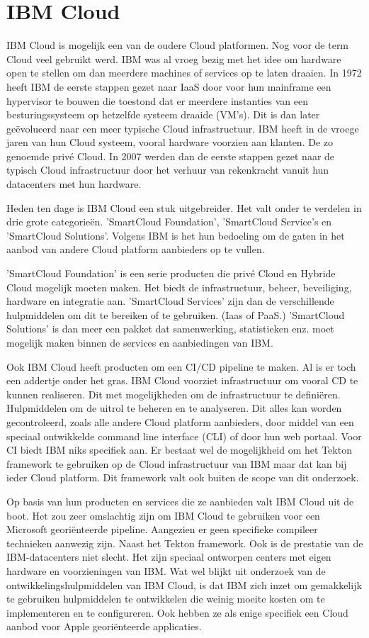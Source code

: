\section{IBM Cloud}
\label{sec:ibmcloud}
IBM Cloud is mogelijk een van de oudere Cloud platformen. Nog voor de term Cloud veel gebruikt werd. IBM was al vroeg bezig met het idee om hardware open te stellen om dan meerdere machines of services op te laten draaien. In 1972 heeft IBM de eerste stappen gezet naar IaaS door voor hun mainframe een hypervisor te bouwen die toestond dat er meerdere instanties van een besturingssysteem op hetzelfde systeem draaide (VM’s). Dit is dan later geëvolueerd naar een meer typische Cloud infrastructuur. IBM heeft in de vroege jaren van hun Cloud systeem, vooral hardware voorzien aan klanten. De zo genoemde privé Cloud. In 2007 werden dan de eerste stappen gezet naar de typisch Cloud infrastructuur door het verhuur van rekenkracht vanuit hun datacenters met hun hardware. 

Heden ten dage is IBM Cloud een stuk uitgebreider. Het valt onder te verdelen in drie grote categorieën. 'SmartCloud Foundation', 'SmartCloud Service's en 'SmartCloud Solutions'. Volgens IBM is het hun bedoeling om de gaten in het aanbod van andere Cloud platform aanbieders op te vullen.

'SmartCloud Foundation' is een serie producten die privé Cloud en Hybride Cloud mogelijk moeten maken. Het biedt de infrastructuur, beheer, beveiliging, hardware en integratie aan. 'SmartCloud Services' zijn dan de verschillende hulpmiddelen om dit te bereiken of te gebruiken. (Iaas of PaaS.) 'SmartCloud Solutions' is dan meer een pakket dat samenwerking, statistieken enz. moet mogelijk maken binnen de services en aanbiedingen van IBM.

Ook IBM Cloud heeft producten om een CI/CD pipeline te maken. Al is er toch een addertje onder het gras. IBM Cloud voorziet infrastructuur om vooral CD te kunnen realiseren. Dit met mogelijkheden om de infrastructuur te definiëren. Hulpmiddelen om de uitrol te beheren en te analyseren. Dit alles kan worden gecontroleerd, zoals alle andere Cloud platform aanbieders, door middel van een speciaal ontwikkelde command line interface (CLI) of door hun web portaal. Voor CI biedt IBM niks specifiek aan. Er bestaat wel de mogelijkheid om het Tekton framework te gebruiken op de Cloud infrastructuur van IBM maar dat kan bij ieder Cloud platform. Dit framework valt ook buiten de scope van dit onderzoek.

Op basis van hun producten en services die ze aanbieden valt IBM Cloud uit de boot. Het zou zeer omslachtig zijn om IBM Cloud te gebruiken voor een Microsoft georiënteerde pipeline. Aangezien er geen specifieke compileer technieken aanwezig zijn. Naast het Tekton framework. Ook is de prestatie van de IBM-datacenters niet slecht. Het zijn speciaal ontworpen centers met eigen hardware en voorzieningen van IBM. Wat wel blijkt uit onderzoek van de ontwikkelingshulpmiddelen van IBM Cloud, is dat IBM zich inzet om gemakkelijk te gebruiken hulpmiddelen te ontwikkelen die weinig moeite kosten om te implementeren en te configureren. Ook hebben ze als enige specifiek een Cloud aanbod voor Apple georiënteerde applicaties.

